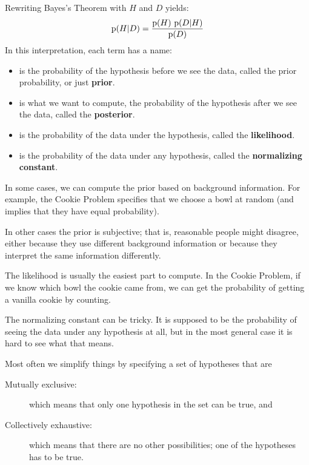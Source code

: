 \documentclass[12pt]{book}
\begin{document}
Rewriting Bayes's Theorem with $H$ and $D$ yields:
%
\[ \mathrm{p}(H|D) = \frac{\mathrm{p}(H)~\mathrm{p}(D|H)}{\mathrm{p}(D)} \]
%
In this interpretation, each term has a name:

\begin{itemize}

\item {} is the probability of the hypothesis before we see
the data, called the prior probability, or just {\bf prior}.

\item {} is what we want to compute, the probability of
the hypothesis after we see the data, called the {\bf posterior}.
 
\item {} is the probability of the data under the hypothesis,
called the {\bf likelihood}.

\item {} is the probability of the data under any hypothesis,
called the {\bf normalizing constant}.

\end{itemize}

In some cases, we can compute the prior
based on background information.  For example, the Cookie
Problem specifies that we choose a bowl at random (and implies
that they have equal probability).

In other cases the prior
is subjective; that is, reasonable people might disagree,
either because they use different background information
or because they interpret the same information differently.

The likelihood is usually the easiest part to compute.  In the
Cookie Problem, if we know which bowl the cookie came from,
we can get the probability of getting a vanilla cookie by counting.

The normalizing constant can be tricky.  It is supposed to be the
probability of seeing the data under any hypothesis at all, but in the
most general case it is hard to see what that means.

Most often we simplify things by specifying a set of hypotheses
that are

\begin{description}

\item[Mutually exclusive:] which means that only one hypothesis in
the set can be true, and

\item[Collectively exhaustive:] which means that there are no other
possibilities; one of the hypotheses has to be true.

\end{description}
\end{document}
